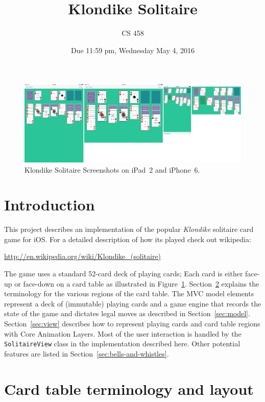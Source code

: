 \documentclass[11pt]{article}
\title{Klondike Solitaire}
\author{CS 458}
\date{Due 11:59 pm, Wednesday May 4, 2016}
\begin{document}
\maketitle


\begin{figure}[ht!] %
   \centering
   \includegraphics[width=\textwidth]{screenshots}
  \caption{Klondike Solitaire Screenshots on iPad~2 and iPhone~6.}
   \label{fig:screenshot}
\end{figure}

\section{Introduction}

This project describes an implementation of the popular 
{\em Klondike} solitaire card game for iOS.
For a detailed description of how its played check out wikipedia:
\begin{flushleft}
\url{http://en.wikipedia.org/wiki/Klondike_(solitaire)}
\end{flushleft}

The game uses a standard 52-card deck of playing cards;
Each card is either face-up or face-down on a card table 
as illustrated in Figure~\ref{fig:screenshot}.
Section~\ref{sec:terms} explains the terminology for the
various regions of the card table. The MVC model elements represent
a deck of (immutable) playing cards and a game engine that records
the state of the game and dictates legal moves as
described in Section~\ref{sec:model}.
Section~\ref{sec:view} describes how to represent playing cards
and card table regions with Core Animation Layers.
Most of the user interaction is handled by the {\tt SolitaireView}
class in the implementation described here.
Other potential features are listed in Section~\ref{sec:bells-and-whistles}.

\pagebreak

\section{Card table terminology and layout} \label{sec:terms}
\end{document}
